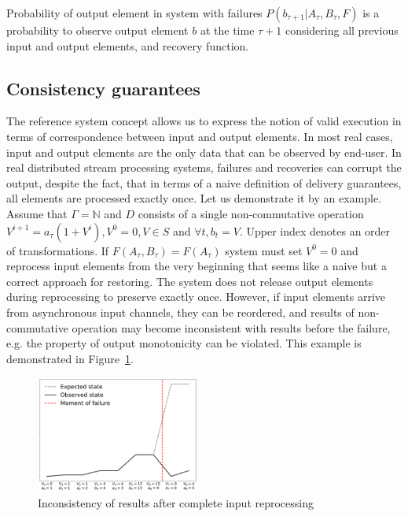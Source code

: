 \begin{definition}{Probability of output element in system with failures}
$P(b_{\tau+1}|A_{\tau}, B_\tau, F)$ is a probability to observe output element $b$ at the time $\tau+1$ considering all previous input and output elements, and recovery function.
\end{definition}

\subsection{Consistency guarantees}

The reference system concept allows us to express the notion of valid execution in terms of correspondence between input and output elements. In most real cases, input and output elements are the only data that can be observed by end-user. In real distributed stream processing systems, failures and recoveries can corrupt the output, despite the fact, that in terms of a naive definition of delivery guarantees, all elements are processed exactly once. Let us demonstrate it by an example. Assume that $\Gamma=\mathbb{N}$ and $D$ consists of a single non-commutative operation $V^{i+1}=a_\tau(1+V^{i}),V^{0}=0,V\in{S}$ and $\forall{t},b_t=V$. Upper index denotes an order of transformations. If $F(A_\tau,B_\tau)=F(A_\tau)$ system must set $V^{0}=0$ and reprocess input elements from the very beginning that seems like a naive but a correct approach for restoring. The system does not release output elements during reprocessing to preserve exactly once. However, if input elements arrive from asynchronous input channels, they can be reordered, and results of non-commutative operation may become inconsistent with results before the failure, e.g. the property of output monotonicity can be violated. This example is demonstrated in Figure~\ref{state-inconsistency}. 

\begin{figure}[htbp]
  \centering
  \includegraphics[width=0.48\textwidth]{pics/failure}
  \caption{Inconsistency of results after complete input reprocessing}
  \label {state-inconsistency}
\end{figure}

